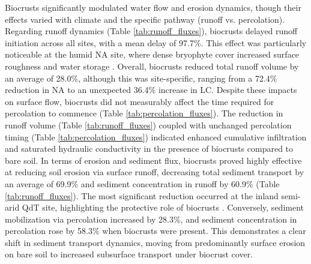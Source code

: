 Biocrusts significantly modulated water flow and erosion dynamics, though their effects varied with climate and the specific pathway (runoff vs. percolation). Regarding runoff dynamics (Table \ref{tab:runoff_fluxes}), biocrusts delayed runoff initiation across all sites, with a mean delay of 97.7\%. This effect was particularly noticeable at the humid NA site, where dense bryophyte cover increased surface roughness and water storage \citep{Kidron2022}. Overall, biocrusts reduced total runoff volume by an average of 28.0\%, although this was site-specific, ranging from a 72.4\% reduction in NA to an unexpected 36.4\% increase in LC. Despite these impacts on surface flow, biocrusts did not measurably affect the time required for percolation to commence (Table \ref{tab:percolation_fluxes}). The reduction in runoff volume (Table \ref{tab:runoff_fluxes}) coupled with unchanged percolation timing (Table \ref{tab:percolation_fluxes}) indicated enhanced cumulative infiltration and saturated hydraulic conductivity in the presence of biocrusts compared to bare soil. In terms of erosion and sediment flux, biocrusts proved highly effective at reducing soil erosion via surface runoff, decreasing total sediment transport by an average of 69.9\% and sediment concentration in runoff by 60.9\% (Table \ref{tab:runoff_fluxes}). The most significant reduction occurred at the inland semi-arid QdT site, highlighting the protective role of biocrusts  \citep{RodriguezCaballero2018}. Conversely, sediment mobilization via percolation increased by 28.3\%, and sediment concentration in percolation rose by 58.3\% when biocrusts were present. This demonstrates a clear shift in sediment transport dynamics, moving from predominantly surface erosion on bare soil to increased subsurface transport under biocrust cover.

